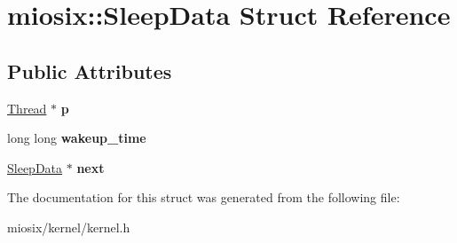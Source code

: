 \hypertarget{structmiosix_1_1_sleep_data}{\section{miosix\-:\-:Sleep\-Data Struct Reference}
\label{structmiosix_1_1_sleep_data}
}
\subsection*{Public Attributes}
\begin{DoxyCompactItemize}
\item 
\hypertarget{structmiosix_1_1_sleep_data_acafb974c5a84d266cfe85bcda2e1b7c3}{\hyperlink{classmiosix_1_1_thread}{Thread} $\ast$ {\bfseries p}}\label{structmiosix_1_1_sleep_data_acafb974c5a84d266cfe85bcda2e1b7c3}

\item 
\hypertarget{structmiosix_1_1_sleep_data_a5519999abebc737e9a684ee50eb6f819}{long long {\bfseries wakeup\-\_\-time}}\label{structmiosix_1_1_sleep_data_a5519999abebc737e9a684ee50eb6f819}

\item 
\hypertarget{structmiosix_1_1_sleep_data_a05f4f0bcfbf43ef6b1c7db45d1e2748b}{\hyperlink{structmiosix_1_1_sleep_data}{Sleep\-Data} $\ast$ {\bfseries next}}\label{structmiosix_1_1_sleep_data_a05f4f0bcfbf43ef6b1c7db45d1e2748b}

\end{DoxyCompactItemize}


The documentation for this struct was generated from the following file\-:\begin{DoxyCompactItemize}
\item 
miosix/kernel/kernel.\-h\end{DoxyCompactItemize}
